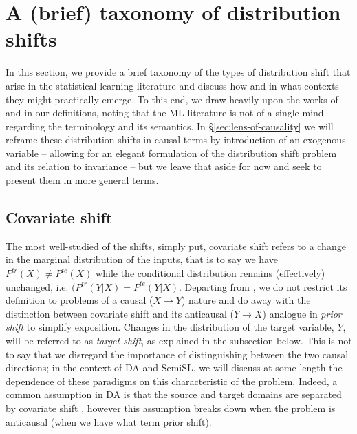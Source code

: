 \section{A (brief) taxonomy of distribution shifts}\label{sec:dist-shift}
In this section, we provide a brief taxonomy of the types of distribution shift that arise in the
statistical-learning literature and discuss how and in what contexts they might practically emerge.
%
To this end, we draw heavily upon the works of \cite{moreno2012unifying} and
\cite{castro2020causality} in our definitions, noting that the ML literature is not of a
single mind regarding the terminology and its semantics.
%
In \S\ref{sec:lens-of-causality} we will reframe these distribution shifts in causal terms by
introduction of an exogenous variable -- allowing for an elegant formulation of the distribution
shift problem and its relation to invariance -- but we leave that aside for now and seek to present
them in more general terms.
\subsection{Covariate shift}\label{ssec:covariate-shift}
The most well-studied of the shifts, simply put, covariate shift refers to a change in the marginal
distribution of the inputs, that is to say we have \( P^{tr}(X) \neq P^{te}(X) \) while the
conditional distribution remains (effectively) unchanged, i.e. \( (P^{tr}(Y|X) = P^{te}(Y|X) \).
%
Departing from \cite{moreno2012unifying}, we do not restrict its definition to problems of a causal
(\( X \to Y\)) nature and do away with the distinction between covariate shift and its anticausal
(\( Y \to X \)) analogue in \emph{prior shift} to simplify exposition.
%
Changes in the distribution of the target variable, \(Y\), will be referred to as \emph{target
shift}, as explained in the subsection below.
%
This is not to say that we disregard the importance of distinguishing between the two causal
directions; in the context of DA and SemiSL, we will discuss at some length the dependence of these
paradigms on this characteristic of the problem.
%
Indeed, a common assumption in DA is that the source and target domains are separated by covariate
shift \citep{david2010impossibility}, however this assumption breaks down when the problem is
anticausal (when we have what \cite{moreno2012unifying} term prior shift).

